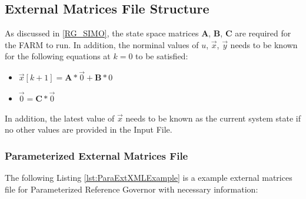 \subsection{External Matrices File Structure}
\label{ExtMatFileStructure}
As discussed in \ref{RG_SIMO}, the state space matrices \begin{math} \textbf{A} \end{math}, 
\begin{math} \textbf{B} \end{math}, \begin{math} \textbf{C} \end{math} are required for the FARM to run. 
In addition, the norminal values of 
\begin{math} u \end{math}, 
\begin{math} \overrightarrow{x} \end{math}, 
\begin{math} \overrightarrow{y} \end{math} needs to be known for the following equations at 
\begin{math}k=0 \end{math} to be satisfied:
\begin{itemize}
  \item \begin{math} \overrightarrow{x}[k+1]=\textbf{A}*\overrightarrow{0}+\textbf{B}*0 \end{math}
  \item \begin{math} \overrightarrow{0}=\textbf{C}*\overrightarrow{0} \end{math}
\end{itemize}
In addition, the latest value of \begin{math} \overrightarrow{x} \end{math} needs to be known as the current system state 
if no other values are provided in the Input File.\newline

\subsubsection{Parameterized External Matrices File}
\label{ParaExtMatFile}
The following Listing \ref{lst:ParaExtXMLExample} is a example external matrices file for Parameterized Reference 
Governor with necessary information:

